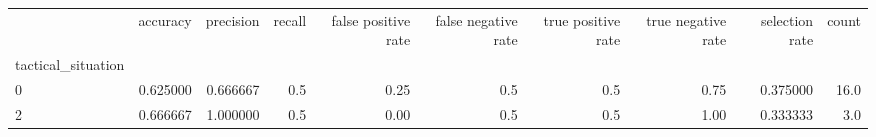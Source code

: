\begin{tabular}{lrrrrrrrrr}
\toprule
{} &  accuracy &  precision &  recall &  false positive rate &  false negative rate &  true positive rate &  true negative rate &  selection rate &  count \\
tactical\_situation &           &            &         &                      &                      &                     &                     &                 &        \\
\midrule
0                  &  0.625000 &   0.666667 &     0.5 &                 0.25 &                  0.5 &                 0.5 &                0.75 &        0.375000 &   16.0 \\
2                  &  0.666667 &   1.000000 &     0.5 &                 0.00 &                  0.5 &                 0.5 &                1.00 &        0.333333 &    3.0 \\
\bottomrule
\end{tabular}
